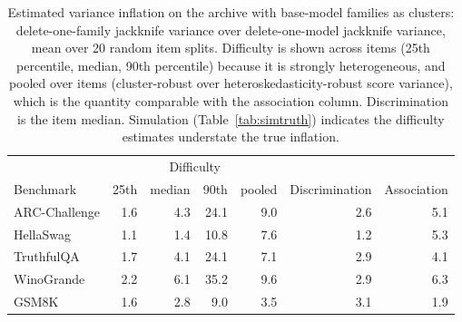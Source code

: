 \begin{table}[!htb]\centering\small
\caption{Estimated variance inflation on the archive with base-model families as clusters: delete-one-family jackknife variance over delete-one-model jackknife variance, mean over 20 random item splits. Difficulty is shown across items (25th percentile, median, 90th percentile) because it is strongly heterogeneous, and pooled over items (cluster-robust over heteroskedasticity-robust score variance), which is the quantity comparable with the association column. Discrimination is the item median. Simulation (Table~\ref{tab:simtruth}) indicates the difficulty estimates understate the true inflation.}\label{tab:inflation}
\begin{tabular}{lrrrrrr}
\toprule
 & \multicolumn{4}{c}{Difficulty} & & \\
Benchmark & 25th & median & 90th & pooled & Discrimination & Association\\
\midrule
ARC-Challenge & 1.6 & 4.3 & 24.1 & 9.0 & 2.6 & 5.1\\
HellaSwag & 1.1 & 1.4 & 10.8 & 7.6 & 1.2 & 5.3\\
TruthfulQA & 1.7 & 4.1 & 24.1 & 7.1 & 2.9 & 4.1\\
WinoGrande & 2.2 & 6.1 & 35.2 & 9.6 & 2.9 & 6.3\\
GSM8K & 1.6 & 2.8 & 9.0 & 3.5 & 3.1 & 1.9\\
\bottomrule
\end{tabular}
\end{table}
